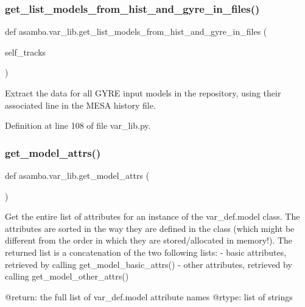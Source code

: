 \subsubsection{\texorpdfstring{get\+\_\+list\+\_\+models\+\_\+from\+\_\+hist\+\_\+and\+\_\+gyre\+\_\+in\+\_\+files()}{get\_list\_models\_from\_hist\_and\_gyre\_in\_files()}}
{\footnotesize\ttfamily def asamba.\+var\+\_\+lib.\+get\+\_\+list\+\_\+models\+\_\+from\+\_\+hist\+\_\+and\+\_\+gyre\+\_\+in\+\_\+files (\begin{DoxyParamCaption}\item[{}]{self\+\_\+tracks }\end{DoxyParamCaption})}

\begin{DoxyVerb}Extract the data for all GYRE input models in the repository, using their associated line in the 
MESA history file.
\end{DoxyVerb}
 

Definition at line 108 of file var\+\_\+lib.\+py.

\mbox{\label{namespaceasamba_1_1var__lib_a0c87523dbf5108a45ba622f3a931ea61}} 
\subsubsection{\texorpdfstring{get\+\_\+model\+\_\+attrs()}{get\_model\_attrs()}}
{\footnotesize\ttfamily def asamba.\+var\+\_\+lib.\+get\+\_\+model\+\_\+attrs (\begin{DoxyParamCaption}{ }\end{DoxyParamCaption})}

\begin{DoxyVerb}Get the entire list of attributes for an instance of the var_def.model class. The attributes are 
sorted in the way they are defined in the class (which might be different from the order in which 
they are stored/allocated in memory!). The returned list is a concatenation of the two following 
lists:
- basic attributes, retrieved by calling get_model_basic_attrs()
- other attributes, retrieved by calling get_model_other_attrs()

@return: the full list of var_def.model attribute names 
@rtype: list of strings
\end{DoxyVerb}
 


